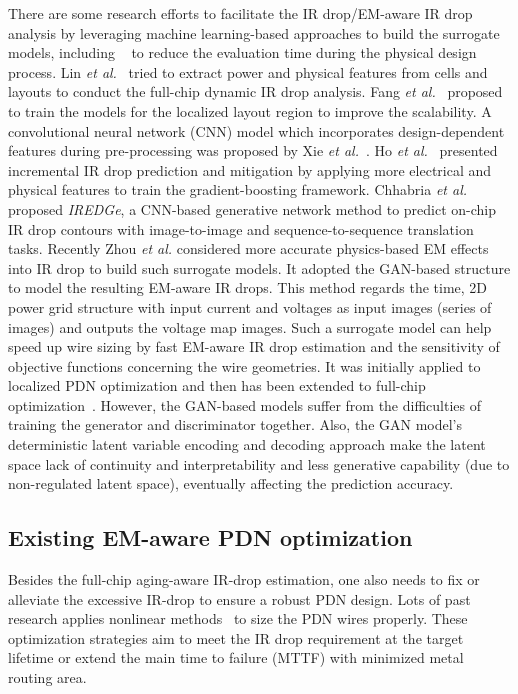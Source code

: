 There are some research efforts to facilitate the IR drop/EM-aware IR drop analysis by leveraging machine learning-based approaches to build the surrogate models, including ~\cite{LinFang:2018vts,Fang:2018dynireco,HoKahng:ICCAD'19,Xie:2020powernet,Sachin:ASPDAC'21} to reduce the evaluation time during the physical design process.  Lin {\it et al.}~\cite{LinFang:2018vts} tried to extract power and physical features from cells and layouts to conduct the full-chip dynamic IR drop analysis. Fang {\it et al.}~\cite{Fang:2018dynireco} proposed to train the models for the localized layout region to improve the scalability.  A convolutional neural network (CNN) model which incorporates design-dependent features during pre-processing was proposed by Xie {\it et al.}~\cite{Xie:2020powernet}. Ho {\it et al.}~\cite{HoKahng:ICCAD'19} presented incremental IR drop prediction and mitigation by applying more electrical and physical features to train the gradient-boosting framework. Chhabria {\it et al.}~\cite{Sachin:ASPDAC'21} proposed {\it IREDGe}, a CNN-based generative network method to predict on-chip IR drop contours with image-to-image and sequence-to-sequence translation tasks.
Recently Zhou {\it et al.} \cite{ZhouJin:ICCAD'20} considered more accurate physics-based EM effects into IR drop to build such surrogate models. It adopted the GAN-based structure to model the resulting EM-aware IR drops.  This method regards the time, 2D power grid structure with input current and voltages as input images (series of images) and outputs the voltage map images. Such a surrogate model can help speed up wire sizing by fast EM-aware IR drop estimation and the sensitivity of objective functions concerning the wire geometries. It was initially applied to localized PDN optimization and then has been extended to full-chip optimization~\cite{HanLiu:TCAD'22-23}.
However, the GAN-based models suffer from the difficulties of training the generator and discriminator together. Also, the GAN model's deterministic latent variable encoding and decoding approach make the latent space lack of continuity and interpretability and less generative capability (due to non-regulated latent space), eventually affecting the prediction accuracy.


\subsection{Existing EM-aware PDN optimization}
 \label{subsec:exist_pgfix}
Besides the full-chip aging-aware IR-drop estimation, one also needs to fix or alleviate the excessive IR-drop to ensure a robust PDN design. Lots of past research applies nonlinear methods~\cite{ChBr:TCAD'88,DuMa:DAC'89,Tan:DAC'99,Wang:TCAD'05,ZhouSun:TVLSI'19, Sukharev:2019pg} to size the PDN wires properly. These optimization strategies aim to meet the IR drop requirement at the target lifetime or extend the main time to failure (MTTF) with minimized metal routing area.

